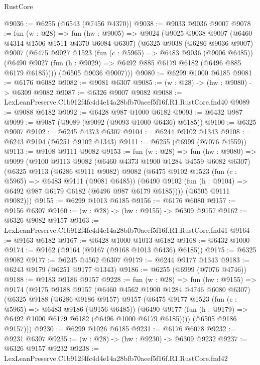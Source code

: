 \begin{lexlean}{RustCore}
\begin{coremodule}
@9036 := @6255 (@6543 (@7456 @4370))
@9038 := @9033 @9036 @9007
@9078 := fun (w : @28) =>
  fun (hw : @9005) =>
  @9024
    (@9025
      @9038
      @9007
      (@6460 @4314 @1506 @1511 @4370 @6084 @6307)
      (@6325
        @9038
        (@6286 @9036 @9007)
        @9007
        (@6475
          @9027
          @1523
          (fun (c : @5965) => @6483 @9036 (@9006 @6485))
          (@6490 @9027 (fun (h : @9029) => @6492 @885 @6179 @6182 (@6496 @885 @6179 @6185))))
        (@6505 @9036 @9007)))
@9080 := @6299 @1000 @6185
@9081 := @6176 @6082
@9082 := @9081 @6307
@9085 := (w : @28) -> (hw : @9080) -> @6309 @9082
@9087 := @6326 @9007 @9082
@9088 := LexLeanPreserve.C1b912f4fc4d4e14a28bfb70aeef5f16f.R1.RustCore.fnd40
@9089 := @9088 @6182
@9092 := @6428 @987 @1000 @6182
@9093 := @6432 @987
@9099 := @9087 (@9089 (@9092 (@9093 @1000 @6436) @6185))
@9100 := @6325 @9007
@9102 := @6245 @4373 @6307
@9104 := @6244 @9102 @1343
@9108 := @6243 @9104 (@6251 @9102 @1343)
@9111 := @6255 (@6999 (@7076 @4559))
@9113 := @9108 @9111 @9082
@9153 := fun (w : @28) =>
  fun (hw : @9080) =>
  @9099
    (@9100
      @9113
      @9082
      (@6460 @4373 @1900 @1284 @4559 @6082 @6307)
      (@6325
        @9113
        (@6286 @9111 @9082)
        @9082
        (@6475
          @9102
          @1523
          (fun (c : @5965) => @6483 @9111 (@9081 @6485))
          (@6490 @9102 (fun (h : @9104) => @6492 @987 @6179 @6182 (@6496 @987 @6179 @6185))))
        (@6505 @9111 @9082)))
@9155 := @6299 @1013 @6185
@9156 := @6176 @6080
@9157 := @9156 @6307
@9160 := (w : @28) -> (hw : @9155) -> @6309 @9157
@9162 := @6326 @9082 @9157
@9163 := LexLeanPreserve.C1b912f4fc4d4e14a28bfb70aeef5f16f.R1.RustCore.fnd41
@9164 := @9163 @6182
@9167 := @6428 @1000 @1013 @6182
@9168 := @6432 @1000
@9174 := @9162 (@9164 (@9167 (@9168 @1013 @6436) @6185))
@9175 := @6325 @9082
@9177 := @6245 @4562 @6307
@9179 := @6244 @9177 @1343
@9183 := @6243 @9179 (@6251 @9177 @1343)
@9186 := @6255 (@6999 (@7076 @4746))
@9188 := @9183 @9186 @9157
@9228 := fun (w : @28) =>
  fun (hw : @9155) =>
  @9174
    (@9175
      @9188
      @9157
      (@6460 @4562 @1900 @1284 @4746 @6080 @6307)
      (@6325
        @9188
        (@6286 @9186 @9157)
        @9157
        (@6475
          @9177
          @1523
          (fun (c : @5965) => @6483 @9186 (@9156 @6485))
          (@6490 @9177 (fun (h : @9179) => @6492 @1000 @6179 @6182 (@6496 @1000 @6179 @6185))))
        (@6505 @9186 @9157)))
@9230 := @6299 @1026 @6185
@9231 := @6176 @6078
@9232 := @9231 @6307
@9235 := (w : @28) -> (hw : @9230) -> @6309 @9232
@9237 := @6326 @9157 @9232
@9238 := LexLeanPreserve.C1b912f4fc4d4e14a28bfb70aeef5f16f.R1.RustCore.fnd42

\end{coremodule}
\end{lexlean}
